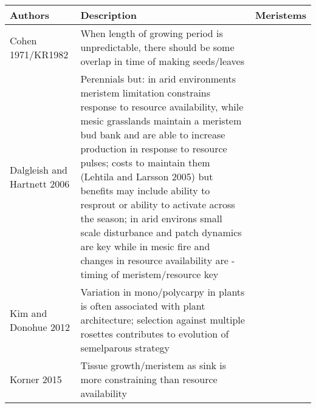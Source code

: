 \documentclass[12pt, oneside]{article}   	%
\begin{document}
  \begin{tabularx}{\textwidth}{|l| >{\setlength{\baselineskip}{.5\baselineskip}}X|l|}
\hline
Authors & Description & Meristems \\ \hline
\cite{} Cohen 1971/KR1982       & When length of growing period is unpredictable, there should be some overlap in time of making seeds/leaves  &           \\ \hline
\cite{} Dalgleish and Hartnett 2006     & Perennials but: in arid environments meristem limitation constrains response to resource availability, while mesic grasslands maintain a meristem bud bank and are able to increase production in response to resource pulses; costs to maintain them (Lehtila and Larsson 2005) but benefits may include ability to resprout or ability to activate across the season; in arid environs small scale disturbance and patch dynamics are key while in mesic fire and changes in resource availability are - timing of meristem/resource key &           \\ \hline
\cite{} Kim and Donohue 2012     & Variation in mono/polycarpy in plants is often associated with plant architecture; selection against multiple rosettes contributes to evolution of semelparous strategy &           \\ \hline
\cite{} Korner 2015     & Tissue growth/meristem as sink is more constraining than resource availability &           \\ \hline

 \end{tabularx}
 
\end{document}
